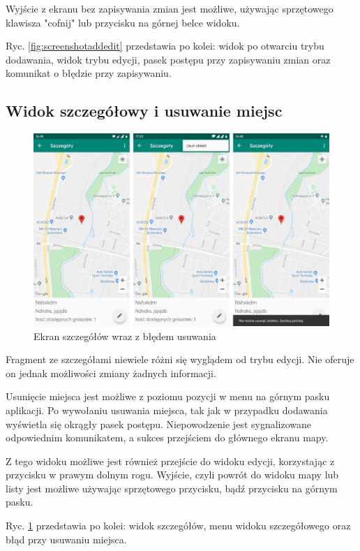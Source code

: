 \documentclass[polish,polish,a4paper,12pt]{article}
\begin{document}
	Wyjście z ekranu bez zapisywania zmian jest możliwe, używając sprzętowego klawisza "cofnij" lub przycisku na górnej belce widoku.

	Ryc. \ref{fig:screenshotaddedit} przedstawia po kolei: widok po otwarciu trybu dodawania, widok trybu edycji, pasek postępu przy zapisywaniu zmian oraz komunikat o błędzie przy zapisywaniu.

	\subsection{Widok szczegółowy i usuwanie miejsc}

	\begin{figure}[H]
		\centering
		\includegraphics[width = \textwidth]{screenshot-detail}
		\caption{Ekran szczegółów wraz z błędem usuwania}
		\label{fig:screenshotdetail}
	\end{figure}

	Fragment ze szczegółami niewiele różni się wyglądem od trybu edycji. Nie oferuje on jednak możliwości zmiany żadnych informacji.

	Usunięcie miejsca jest możliwe z poziomu pozycji w menu na górnym pasku aplikacji. Po wywołaniu usuwania miejsca, tak jak w przypadku dodawania wyświetla się okrągły pasek postępu. Niepowodzenie jest sygnalizowane odpowiednim komunikatem, a sukces przejściem do głównego ekranu mapy.

	Z tego widoku możliwe jest również przejście do widoku edycji, korzystając z przycisku w prawym dolnym rogu. Wyjście, czyli powrót do widoku mapy lub listy jest możliwe używając sprzętowego przycisku, bądź przycisku na górnym pasku.

	Ryc. \ref{fig:screenshotdetail} przedstawia po kolei: widok szczegółów, menu widoku szczegółowego oraz błąd przy usuwaniu miejsca.
\end{document}
